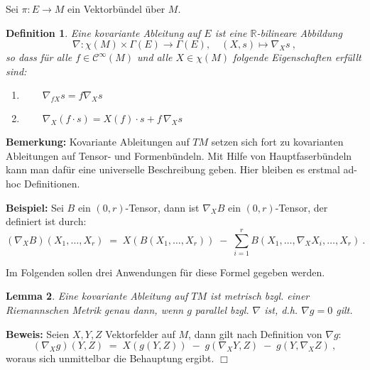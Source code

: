 \documentclass[12pt,a4paper]{article}
\def\R{\mathbb{R}}
\newtheorem{Lemma}{Lemma}[section]
\newtheorem{Definition}[Lemma]{Definition}
\def\proof{\noindent\textbf{Beweis:}\quad}
\def\qed{\quad\hfill\ensuremath{\Box}}
\begin{document}
\bigskip


Sei $\pi : E \rightarrow M$ ein Vektorb\"undel \"uber $M$.

\begin{Definition}
Eine {\em kovariante Ableitung} auf $E$ ist eine $\R$-bilineare
Abbildung
$$
\nabla : \chi(M) \times \Gamma(E) \rightarrow \Gamma(E),\quad
(X, s) \mapsto \nabla_Xs \ ,
$$
so dass f\"ur alle $f\in \mathcal C^\infty(M)$ und alle $X\in \chi(M)$
folgende Eigenschaften erf\"ullt sind:
\begin{enumerate}
 \item
  $\qquad \nabla_{fX} s = f \nabla_Xs$
 \item
  $ \qquad \nabla_X (f \cdot s) = X(f) \cdot s + f \, \nabla_Xs $
\end{enumerate}
\end{Definition}

\bigskip

{\bf Bemerkung:}
Kovariante Ableitungen auf $TM$ setzen sich fort zu kovarianten
Ableitungen auf Tensor- und Formenb\"undeln. Mit Hilfe von
Hauptfaserb\"undeln kann man daf\"ur eine universelle Beschreibung
geben. Hier bleiben es erstmal ad-hoc Definitionen.

\bigskip

{\bf Beispiel:} Sei $B$ ein $(0,r)$-Tensor, dann ist $\nabla_XB$
ein $(0,r)$-Tensor, der definiert ist durch:
$$
(\nabla_X B)(X_1, \ldots, X_r) \;=\; X(B(X_1,\ldots, X_r))
\;-\;
\sum^r_{i=1} B(X_1, \ldots, \nabla_XX_i, \ldots, X_r) \ .
$$

\bigskip

Im Folgenden sollen drei Anwendungen f\"ur diese Formel gegeben werden.

\medskip

\begin{Lemma}
Eine kovariante Ableitung auf $TM$ ist metrisch bzgl. einer Riemannschen
Metrik genau dann, wenn $g$ parallel bzgl. $\nabla$ ist, d.h. $\nabla g = 0$
gilt.
\end{Lemma}
\proof
Seien $X,Y,Z$ Vektorfelder auf $M$, dann gilt nach Definition von $\nabla g$:
$$
(\nabla_X g)(Y, Z) \;=\; X(g(Y,Z)) \;-\; g(\nabla_XY, Z) \;-\; g(Y, \nabla_XZ) \ ,
$$
woraus sich unmittelbar die Behauptung ergibt.
\qed

\bigskip
\end{document}
